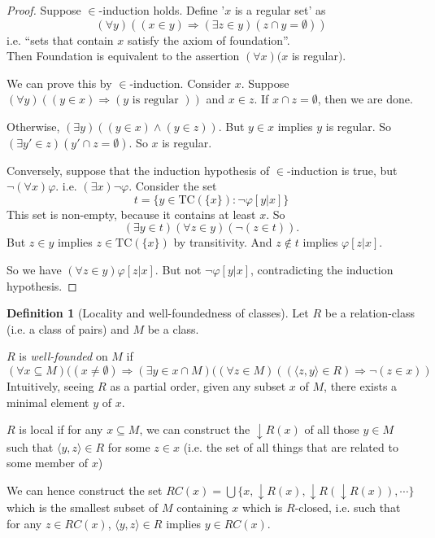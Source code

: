 \documentclass[a4paper]{article}
\theoremstyle{definition}
\newtheorem*{defi}{Definition}
\newcommand{\TC}{\mathrm{TC}}
\newcommand{\bra}{\langle}
\newcommand{\ket}{\rangle}
\begin{document}
\begin{proof}
  Suppose $\in$-induction holds. Define '$x$ is a regular set' as 
  \[
  (\forall y)((x\in y)\Rightarrow (\exists z\in y)(z\cap y = \emptyset))
  \]
  i.e. ``sets that contain $x$ satisfy the axiom of foundation''.\\
  Then Foundation is equivalent to the assertion $(\forall x)(x$ is regular$)$.

  We can prove this by $\in$-induction. Consider $x$. Suppose $(\forall y)((y\in x)\Rightarrow (y\text{ is regular }))$ and $x\in z$. If $x\cap z = \emptyset$, then we are done.

  Otherwise, $(\exists y)((y\in x)\wedge (y\in z))$. But $y\in x$ implies $y$ is regular. So $(\exists y'\in z)(y'\cap z = \emptyset)$. So $x$ is regular.

  Conversely, suppose that the induction hypothesis of $\in$-induction is true, but $\neg(\forall x)\varphi$. i.e. $(\exists x)\neg\varphi$. Consider the set
  \[
  t = \{y\in \TC(\{x\}): \neg\varphi[y|x]\}
  \]
  This set is non-empty, because it contains at least $x$. So
  \[
  (\exists y\in t)(\forall z\in y)(\neg(z\in t)).
  \]
  But $z\in y$ implies $z\in \TC(\{x\})$ by transitivity. And $z\not\in t$ implies $\varphi[z|x]$.

  So we have $(\forall z\in y)\varphi[z|x]$. But not $\neg \varphi[y|x]$, contradicting the induction hypothesis.
\end{proof}

\begin{defi}[Locality and well-foundedness of classes]
  Let $R$ be a relation-class (i.e. a class of pairs) and $M$ be a class.

  $R$ is \emph{well-founded} on $M$ if
  \[
  (\forall x\subseteq M)((x\not= \emptyset)\Rightarrow (\exists y\in x\cap M)((\forall z\in M)((\bra z, y\ket\in R) \Rightarrow \neg (z\in x))
  \]
  Intuitively, seeing $R$ as a partial order, given any subset $x$ of $M$, there exists a minimal element $y$ of $x$.

  $R$ is local if for any $x\subseteq M$, we can construct the $\downarrow R(x)$ of all those $y\in M$ such that $\bra y, z\ket \in R$ for some $z\in x$ (i.e. the set of all things that are related to some member of $x$)

  We can hence construct the set $RC(x) = \bigcup\{x, \downarrow R(x), \downarrow R(\downarrow R(x)), \cdots\}$ which is the smallest subset of $M$ containing $x$ which is $R$-closed, i.e. such that for any $z\in RC(x)$, $\bra y, z\ket\in R$  implies $y\in RC(x)$.
\end{defi}
\end{document}
